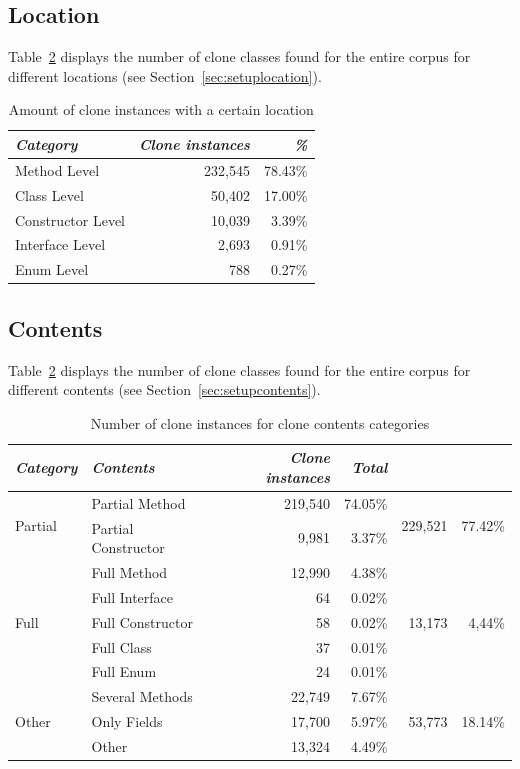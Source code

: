 \subsection{Location}
Table~\ref{tab:contents} displays the number of clone classes found for the entire corpus for different locations (see Section~\ref{sec:setuplocation}).
\begin{table}[H]
\centering
\begin{tabular}{@{}lrr@{}}
\toprule
\textit{\textbf{Category}} & \textit{\textbf{Clone instances}} & \textit{\textbf{\%}} \\ \midrule
Method Level & 232,545 & 78.43\% \\
Class Level & 50,402 & 17.00\% \\
Constructor Level & 10,039 & 3.39\% \\
Interface Level & 2,693 & 0.91\% \\
Enum Level & 788 & 0.27\% \\
\end{tabular}
\caption{Amount of clone instances with a certain location} %
\label{tab:location}
\end{table}

\subsection{Contents}
Table~\ref{tab:contents} displays the number of clone classes found for the entire corpus for different contents (see Section~\ref{sec:setupcontents}).

\begin{table}[H]
\centering
\begin{tabular}{@{}llrrrr@{}}
\toprule
\textit{\textbf{Category}} & \textit{\textbf{Contents}} & \textit{\textbf{Clone instances}} & \textit{\textbf{Total}} \\ \midrule
\multirow{2}{*}{Partial} & Partial Method & 219,540 & 74.05\% & \multirow{2}{*}{229,521}& \multirow{2}{*}{77.42\%} \\ \cmidrule(lr){2-4}
 & Partial Constructor & 9,981 & 3.37\% & & \\ \midrule
\multirow{5}{*}{Full} & Full Method & 12,990 & 4.38\% & \multirow{5}{*}{13,173}& \multirow{5}{*}{4,44\%} \\ \cmidrule(lr){2-4}
 & Full Interface & 64 & 0.02\% & & \\ \cmidrule(lr){2-4}
 & Full Constructor & 58 & 0.02\% & & \\ \cmidrule(lr){2-4}
 & Full Class & 37 & 0.01\% & & \\ \cmidrule(lr){2-4}
 & Full Enum & 24 & 0.01\% & & \\ \midrule
\multirow{3}{*}{Other} & Several Methods & 22,749 & 7.67\% & \multirow{3}{*}{53,773} & \multirow{3}{*}{18.14\%} \\ \cmidrule(lr){2-4}
 & Only Fields & 17,700 & 5.97\% & & \\ \cmidrule(lr){2-4}
 & Other & 13,324 & 4.49\% & & \\ \bottomrule
\end{tabular}
\caption{Number of clone instances for clone contents categories}
\label{tab:contents}
\end{table}

